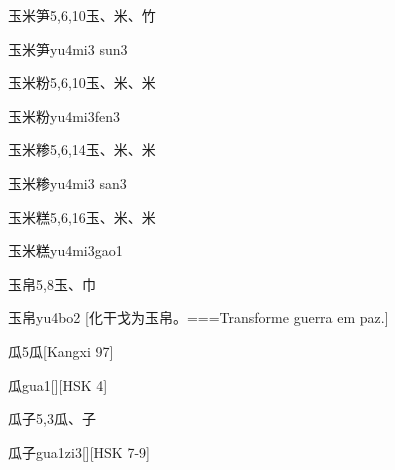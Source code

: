 \begin{Entry}{玉米笋}{5,6,10}{⽟、⽶、⽵}
  \begin{Phonetics}{玉米笋}{yu4mi3 sun3}
  \end{Phonetics}
\end{Entry}

\begin{Entry}{玉米粉}{5,6,10}{⽟、⽶、⽶}
  \begin{Phonetics}{玉米粉}{yu4mi3fen3}
  \end{Phonetics}
\end{Entry}

\begin{Entry}{玉米糁}{5,6,14}{⽟、⽶、⽶}
  \begin{Phonetics}{玉米糁}{yu4mi3 san3}
  \end{Phonetics}
\end{Entry}

\begin{Entry}{玉米糕}{5,6,16}{⽟、⽶、⽶}
  \begin{Phonetics}{玉米糕}{yu4mi3gao1}
  \end{Phonetics}
\end{Entry}

\begin{Entry}{玉帛}{5,8}{⽟、⼱}
  \begin{Phonetics}{玉帛}{yu4bo2}
    [化干戈为玉帛。===Transforme guerra em paz.]
  \end{Phonetics}
\end{Entry}

\begin{Entry}{瓜}{5}{⽠}[Kangxi 97]
  \begin{Phonetics}{瓜}{gua1}[][HSK 4]
  \end{Phonetics}
\end{Entry}

\begin{Entry}{瓜子}{5,3}{⽠、⼦}
  \begin{Phonetics}{瓜子}{gua1zi3}[][HSK 7-9]
  \end{Phonetics}
\end{Entry}

